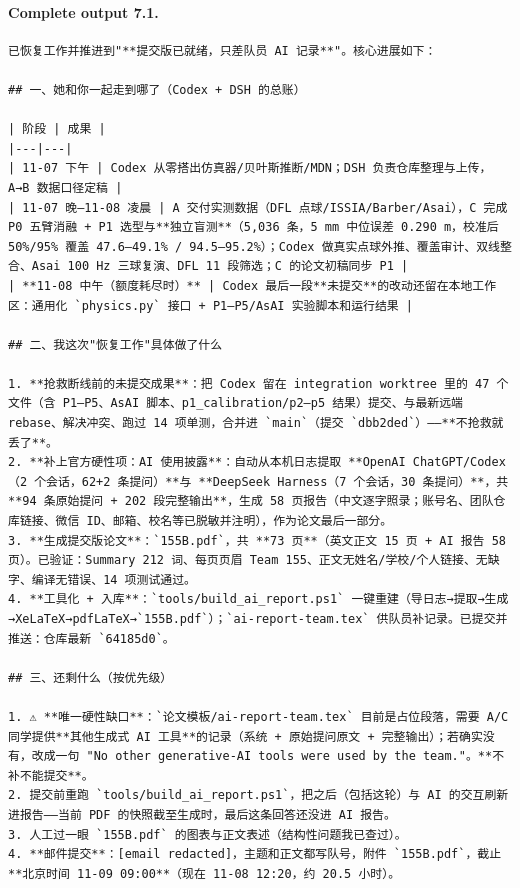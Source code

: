 \documentclass[UTF8,10pt]{ctexart}
\begin{document}
\paragraph{Complete output 7.1.}
\begin{Verbatim}[breaklines=true,breakanywhere=true,fontsize=\scriptsize,frame=single,framesep=2pt]
已恢复工作并推进到"**提交版已就绪，只差队员 AI 记录**"。核心进展如下：

## 一、她和你一起走到哪了（Codex + DSH 的总账）

| 阶段 | 成果 |
|---|---|
| 11-07 下午 | Codex 从零搭出仿真器/贝叶斯推断/MDN；DSH 负责仓库整理与上传，A→B 数据口径定稿 |
| 11-07 晚–11-08 凌晨 | A 交付实测数据（DFL 点球/ISSIA/Barber/Asai），C 完成 P0 五臂消融 + P1 选型与**独立盲测**（5,036 条，5 mm 中位误差 0.290 m，校准后 50%/95% 覆盖 47.6–49.1% / 94.5–95.2%）；Codex 做真实点球外推、覆盖审计、双线整合、Asai 100 Hz 三球复演、DFL 11 段筛选；C 的论文初稿同步 P1 |
| **11-08 中午（额度耗尽时）** | Codex 最后一段**未提交**的改动还留在本地工作区：通用化 `physics.py` 接口 + P1–P5/AsAI 实验脚本和运行结果 |

## 二、我这次"恢复工作"具体做了什么

1. **抢救断线前的未提交成果**：把 Codex 留在 integration worktree 里的 47 个文件（含 P1–P5、AsAI 脚本、p1_calibration/p2–p5 结果）提交、与最新远端 rebase、解决冲突、跑过 14 项单测，合并进 `main`（提交 `dbb2ded`）——**不抢救就丢了**。
2. **补上官方硬性项：AI 使用披露**：自动从本机日志提取 **OpenAI ChatGPT/Codex（2 个会话，62+2 条提问）**与 **DeepSeek Harness（7 个会话，30 条提问）**，共 **94 条原始提问 + 202 段完整输出**，生成 58 页报告（中文逐字照录；账号名、团队仓库链接、微信 ID、邮箱、校名等已脱敏并注明），作为论文最后一部分。
3. **生成提交版论文**：`155B.pdf`，共 **73 页**（英文正文 15 页 + AI 报告 58 页）。已验证：Summary 212 词、每页页眉 Team 155、正文无姓名/学校/个人链接、无缺字、编译无错误、14 项测试通过。
4. **工具化 + 入库**：`tools/build_ai_report.ps1` 一键重建（导日志→提取→生成→XeLaTeX→pdfLaTeX→`155B.pdf`）；`ai-report-team.tex` 供队员补记录。已提交并推送：仓库最新 `64185d0`。

## 三、还剩什么（按优先级）

1. ⚠ **唯一硬性缺口**：`论文模板/ai-report-team.tex` 目前是占位段落，需要 A/C 同学提供**其他生成式 AI 工具**的记录（系统 + 原始提问原文 + 完整输出）；若确实没有，改成一句 "No other generative-AI tools were used by the team."。**不补不能提交**。
2. 提交前重跑 `tools/build_ai_report.ps1`，把之后（包括这轮）与 AI 的交互刷新进报告——当前 PDF 的快照截至生成时，最后这条回答还没进 AI 报告。
3. 人工过一眼 `155B.pdf` 的图表与正文表述（结构性问题我已查过）。
4. **邮件提交**：[email redacted]，主题和正文都写队号，附件 `155B.pdf`，截止 **北京时间 11-09 09:00**（现在 11-08 12:20，约 20.5 小时）。


\end{Verbatim}
\end{document}
